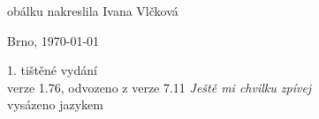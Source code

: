 \vspace*{\fill}
\hspace{10mm}obálku nakreslila Ivana Vlčková\\
\begin{otherlanguage}{czech}
Brno, \today\\
\end{otherlanguage}
1. tištěné vydání\\
verze 1.76, odvozeno z verze 7.11 \textit{Ještě mi chvilku zpívej}\\
vysázeno jazykem \LaTeXe
\vspace{2cm}
\newpage